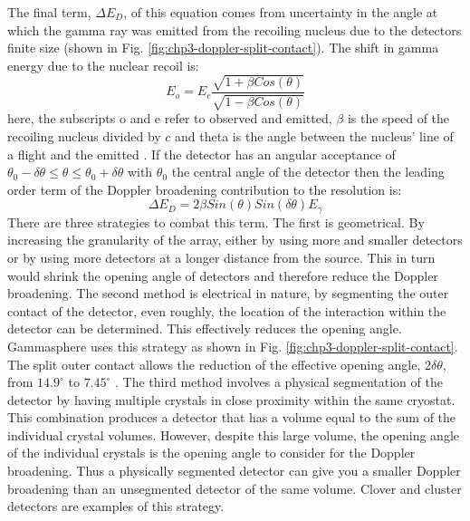 The final term, $\Delta{}E_{D}$, of this equation comes from uncertainty in the angle at which the gamma ray was emitted from the recoiling nucleus due to the detectors finite size (shown in Fig. \ref{fig:chp3-doppler-split-contact}). The shift in gamma energy due to the nuclear recoil is:
\begin{equation}
\label{eqn:chp3-doppler_formula} 
E_{o} = E_{e}\frac{\sqrt{1+\beta{}Cos(\theta)}}{\sqrt{1-\beta{}Cos(\theta)}}
\end{equation}
here, the subscripts o and e refer to observed and emitted, $\beta$ is the speed of the recoiling nucleus divided by $c$ and theta is the angle between the nucleus' line of a flight and the emitted \gr{}. If the detector has an angular acceptance of $\theta{}_{0}-\delta{}\theta{}\leq{}\theta{}\leq{}\theta{}_{0}+\delta{}\theta{}$ with $\theta{}_{0}$ the central angle of the detector then the leading order term of the Doppler broadening contribution to the resolution is:
\begin{equation}
\label{eqn:chp3-res-doppler-term} 
\Delta{}E_{D} = 2\beta{}Sin(\theta{})Sin(\delta{}\theta{})E_{\gamma}
\end{equation}
There are three strategies to combat this term. The first is geometrical. By increasing the granularity of the array, either by using more and smaller detectors or by using more detectors at a longer distance from the source. This in turn would shrink the opening angle of detectors and therefore reduce the Doppler broadening. The second method is electrical in nature, by segmenting the outer contact of the detector, even roughly, the location of the interaction within the detector can be determined. This effectively reduces the opening angle. Gammasphere uses this strategy as shown in Fig. \ref{fig:chp3-doppler-split-contact}. The split outer contact allows the reduction of the effective opening angle, $2\delta{}\theta{}$, from $14.9^{\circ}$ to $7.45^{\circ}$ \cite{TheGS}. The third method involves a physical segmentation of the detector by having multiple crystals in close proximity within the same cryostat. This combination produces a detector that has a volume equal to the sum of the individual crystal volumes. However, despite this large volume, the opening angle of the individual crystals is the opening angle to consider for the Doppler broadening. Thus a physically segmented detector can give you a smaller Doppler broadening than an unsegmented detector of the same volume.  Clover and cluster detectors\cite{cloverDet,clusterDetector} are examples of this strategy.

